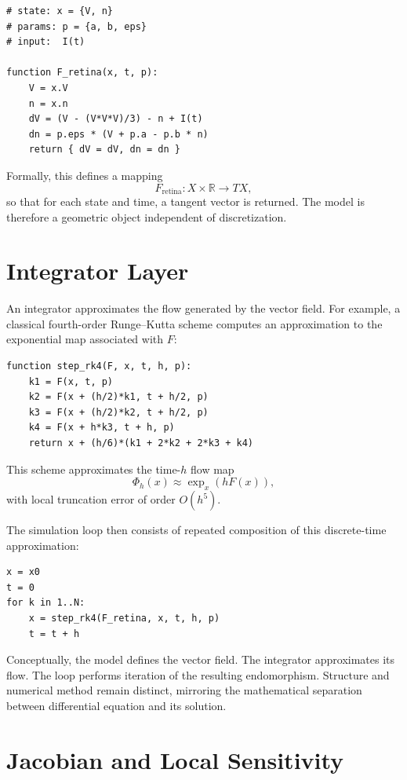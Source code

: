 \documentclass[12pt]{book}
\begin{document}
\begin{verbatim}
# state: x = {V, n}
# params: p = {a, b, eps}
# input:  I(t)

function F_retina(x, t, p):
    V = x.V
    n = x.n
    dV = (V - (V*V*V)/3) - n + I(t)
    dn = p.eps * (V + p.a - p.b * n)
    return { dV = dV, dn = dn }
\end{verbatim}

Formally, this defines a mapping
\[
F_{\text{retina}} : X \times \mathbb{R} \to TX,
\]
so that for each state and time, a tangent vector is returned.
The model is therefore a geometric object independent of discretization.

\section{Integrator Layer}

An integrator approximates the flow generated by the vector field.
For example, a classical fourth-order Runge--Kutta scheme computes
an approximation to the exponential map associated with $F$:

\begin{verbatim}
function step_rk4(F, x, t, h, p):
    k1 = F(x, t, p)
    k2 = F(x + (h/2)*k1, t + h/2, p)
    k3 = F(x + (h/2)*k2, t + h/2, p)
    k4 = F(x + h*k3, t + h, p)
    return x + (h/6)*(k1 + 2*k2 + 2*k3 + k4)
\end{verbatim}

This scheme approximates the time-$h$ flow map
\[
\Phi_h(x) \approx \exp_x(h F(x)),
\]
with local truncation error of order $O(h^5)$.

The simulation loop then consists of repeated composition of this
discrete-time approximation:

\begin{verbatim}
x = x0
t = 0
for k in 1..N:
    x = step_rk4(F_retina, x, t, h, p)
    t = t + h
\end{verbatim}

Conceptually, the model defines the vector field.
The integrator approximates its flow.
The loop performs iteration of the resulting endomorphism.
Structure and numerical method remain distinct, mirroring the
mathematical separation between differential equation and its solution.

\section{Jacobian and Local Sensitivity}
\end{document}
